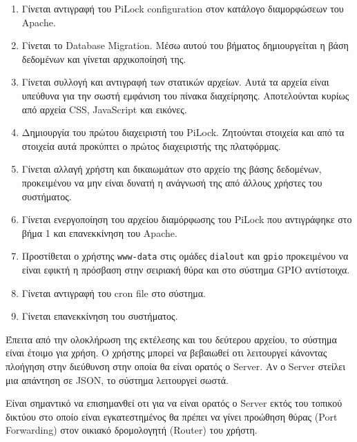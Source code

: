 \begin{enumerate}
	\item Γίνεται αντιγραφή του PiLock configuration στον κατάλογο διαμορφώσεων του Apache. 
	\item Γίνεται το Database Migration. Μέσω αυτού του βήματος δημιουργείται η βάση δεδομένων και γίνεται αρχικοποίησή της.
	\item Γίνεται συλλογή και αντιγραφή των στατικών αρχείων. Αυτά τα αρχεία είναι υπεύθυνα για την σωστή εμφάνιση του πίνακα διαχείρησης. Αποτελούνται κυρίως από αρχεία CSS, JavaScript και εικόνες.
	\item Δημιουργία του πρώτου διαχειριστή του PiLock. Ζητούνται στοιχεία και από τα στοιχεία αυτά προκύπτει ο πρώτος διαχειριστής της πλατφόρμας.
	\item Γίνεται αλλαγή χρήστη και δικαιωμάτων στο αρχείο της βάσης δεδομένων, προκειμένου να μην είναι δυνατή η ανάγνωσή της από άλλους χρήστες του συστήματος.
	\item Γίνεται ενεργοποίηση του αρχείου διαμόρφωσης του PiLock που αντιγράφηκε στο βήμα 1 και επανεκκίνηση του Apache.
	\item Προστίθεται ο χρήστης \verb|www-data| στις ομάδες \verb|dialout| και \verb|gpio| προκειμένου να είναι εφικτή η πρόσβαση στην σειριακή θύρα και στο σύστημα GPIO αντίστοιχα.
	\item Γίνεται αντιγραφή του cron file στο σύστημα.
	\item Γίνεται επανεκκίνηση του συστήματος.
\end{enumerate}

Έπειτα από την ολοκλήρωση της εκτέλεσης και του δεύτερου αρχείου, το σύστημα είναι έτοιμο για χρήση. Ο χρήστης μπορεί να βεβαιωθεί οτι λειτουργεί κάνοντας πλοήγηση στην διεύθυνση στην οποία θα είναι ορατός ο Server. Αν ο Server στείλει μια απάντηση σε JSON, το σύστημα λειτουργεί σωστά.

Είναι σημαντικό να επισημανθεί οτι για να είναι ορατός ο Server εκτός του τοπικού δικτύου στο οποίο είναι εγκατεστημένος θα πρέπει να γίνει προώθηση θύρας (Port Forwarding) στον οικιακό δρομολογητή (Router) του χρήστη.